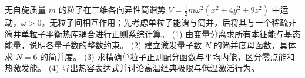 无自旋质量 \(m\) 的粒子在三维各向异性简谐势 \(V=\frac12m\omega^2(x^2+4y^2+9z^2)\) 中运动，\(\omega>0\)。无粒子间相互作用；先考虑单粒子能谱与简并，后将其与一个稀疏非简并单粒子平衡热库耦合进行正则系综计算。
(1) 由变量分离求所有本征能与基态能量，说明各量子数的整数约束。
(2) 建立激发量子数 \(N\) 的简并度母函数，具体求 \(N=6\) 的简并度。
(3) 求精确单粒子正则配分函数与平均内能，区分零点能和热激发能。
(4) 导出热容表达式并讨论高温经典极限与低温激活行为。

